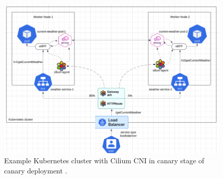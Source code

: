 \begin{figure}[H]
    \centering
    \includegraphics[width=1\columnwidth]{images/cilium_dataflow.png}
    \caption{Example Kubernetes cluster with Cilium CNI in canary stage of canary deployment \cite{K8sIcons}\cite{LucidApp}\cite{CiliumEgressGatewayBlog}.}
    \label{fig:ciliumDataflow}
\end{figure}

